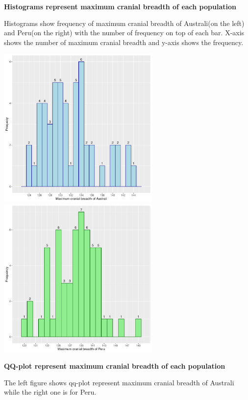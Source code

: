 \documentclass[12pt, oneside]{report}\usepackage[]{graphicx}\usepackage[]{color}
\begin{document}
\begin{center}
\textbf {Histograms represent maximum cranial breadth of each population} \\
\end{center}
Histograms show frequency of maximum cranial breadth of Australi(on the left) and Peru(on the right) with the number of frequency on top of each bar. X-axis shows the number of maximum cranial breadth and y-axis shows the frequency.\\
\begin{Schunk}

\includegraphics[width=8cm,height=8cm]{figure/unnamed-chunk-8-1} \includegraphics[width=8cm,height=8cm]{figure/unnamed-chunk-8-2} \end{Schunk}
\newpage
\begin{center}
\textbf {QQ-plot represent maximum cranial breadth of each population} \\
\end{center}
The left figure shows qq-plot represent maximum cranial breadth of Australi while the right one is for Peru. \\
\end{document}
